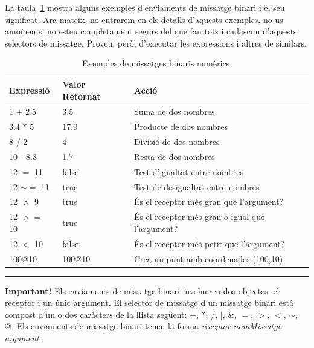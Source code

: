 La taula~\ref{tab1102} mostra alguns exemples d'enviaments de missatge binari i el seu significat. Ara mateix, no entrarem en els detalls d'aquests exemples, no us amoïneu si no esteu completament segurs del que fan tots i cadascun d'aquests selectors de missatge. Proveu, però, d'executar les expressions i altres de similars.

\begin{table}[h]
\caption{Exemples de missatges binaris numèrics.}
\label{tab1102}
\begin{center}
{\small \begin{tabular}{p{25mm}p{40mm}p{75mm}}
\hline
\textbf{Expressió} & \textbf{Valor Retornat} & \textbf{Acció}\\
\hline
\textsf{1 + 2.5} & \textsf{3.5} & 
Suma de dos nombres\\
\textsf{3.4 \textsf{$*$} 5} & \textsf{17.0} & 
Producte de dos nombres\\
\textsf{8 / 2} & \textsf{4} & 
Divisió de dos nombres\\
\textsf{10 - 8.3} & \textsf{1.7} & 
Resta de dos nombres\\
\textsf{12 $=$ 11} & \textsf{false} & 
Test d'igualtat entre nombres\\
\textsf{12 $\sim=$ 11} & \textsf{true} & 
Test de desigualtat entre nombres\\
\textsf{12 $>$ 9} & \textsf{true} & 
És el receptor més gran que l'argument?\\
\textsf{12 $>=$ 10} & \textsf{true} & 
És el receptor més gran o igual que l'argument?\\
\textsf{12 $<$ 10} & \textsf{false} & 
És el receptor més petit que l'argument?\\
\textsf{100@10} & \textsf{100@10} & 
Crea un punt amb coordenades (100,10)\\
\hline
\end{tabular}}
\end{center}
\end{table}

\noindent
\rule{\textwidth}{2pt}
\noindent
\textbf{Important!} Els enviaments de missatge binari involucren dos objectes: el receptor i un únic argument. El selector de missatge d'un missatge binari està compost d'un o dos caràcters de la llista següent:  \textsf{$+$}, \textsf{$*$}, \textsf{$/$}, \textsf{$|$}, \textsf{\&}, \textsf{$=$}, \textsf{$>$}, \textsf{$<$}, \textsf{$\sim$}, \textsf{@}. Els enviaments de missatge binari tenen la forma \textsf{{\itshape receptor nomMissatge argument}}.

